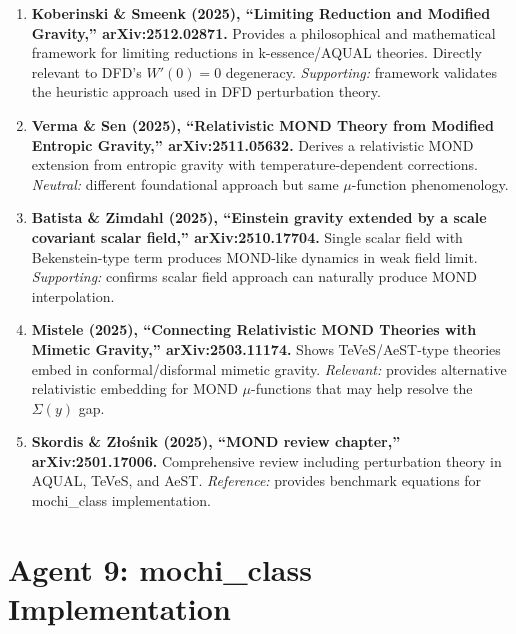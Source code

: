 \documentclass[11pt]{article}
\begin{document}
\begin{tcolorbox}[colback=green!5!white, colframe=green!50!black,
  title=\textbf{Agent 4: NEW LITERATURE REVIEWED}]

\begin{enumerate}

\item \textbf{Koberinski \& Smeenk (2025), ``Limiting Reduction and
  Modified Gravity,'' arXiv:2512.02871.}
  Provides a philosophical and mathematical framework for limiting
  reductions in k-essence/AQUAL theories. Directly relevant to DFD's
  $W'(0) = 0$ degeneracy. \emph{Supporting:} framework validates the
  heuristic approach used in DFD perturbation theory.

\item \textbf{Verma \& Sen (2025), ``Relativistic MOND Theory from
  Modified Entropic Gravity,'' arXiv:2511.05632.}
  Derives a relativistic MOND extension from entropic gravity with
  temperature-dependent corrections. \emph{Neutral:} different
  foundational approach but same $\mu$-function phenomenology.

\item \textbf{Batista \& Zimdahl (2025), ``Einstein gravity extended
  by a scale covariant scalar field,'' arXiv:2510.17704.}
  Single scalar field with Bekenstein-type term produces MOND-like
  dynamics in weak field limit. \emph{Supporting:} confirms scalar
  field approach can naturally produce MOND interpolation.

\item \textbf{Mistele (2025), ``Connecting Relativistic MOND Theories
  with Mimetic Gravity,'' arXiv:2503.11174.}
  Shows TeVeS/AeST-type theories embed in conformal/disformal mimetic
  gravity. \emph{Relevant:} provides alternative relativistic embedding
  for MOND $\mu$-functions that may help resolve the $\Sigma(y)$ gap.

\item \textbf{Skordis \& Z\l{}o\'snik (2025), ``MOND review chapter,''
  arXiv:2501.17006.}
  Comprehensive review including perturbation theory in AQUAL, TeVeS,
  and AeST. \emph{Reference:} provides benchmark equations for
  mochi\_class implementation.

\end{enumerate}
\end{tcolorbox}

\section{Agent 9: mochi\_class Implementation}
\end{document}
